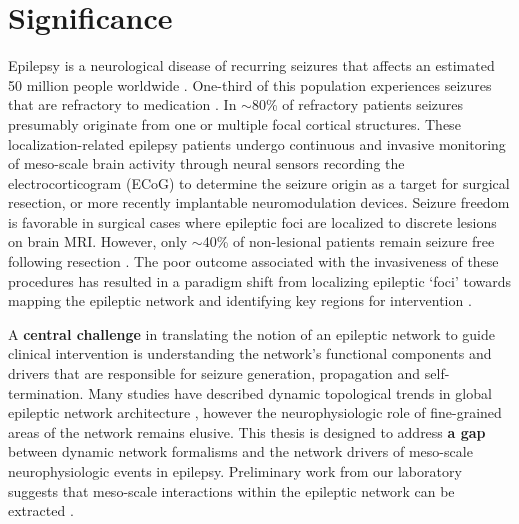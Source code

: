 \section{Significance}
Epilepsy is a neurological disease of recurring seizures that affects an estimated 50 million people worldwide \cite{kwan2000early}. One-third of this population experiences seizures that are refractory to medication \cite{kwan2000early}. In $\sim$80\% of refractory patients seizures presumably originate from one or multiple focal cortical structures. These localization-related epilepsy patients undergo continuous and invasive monitoring of meso-scale brain activity through neural sensors recording the electrocorticogram (ECoG) to determine the seizure origin as a target for surgical resection, or more recently implantable neuromodulation devices. Seizure freedom is favorable in surgical cases where epileptic foci are localized to discrete lesions on brain MRI. However, only $\sim$40\% of non-lesional patients remain seizure free following resection \cite{french2007refractory}. The poor outcome associated with the invasiveness of these procedures has resulted in a paradigm shift from localizing epileptic `foci' towards mapping the epileptic network and identifying key regions for intervention \cite{spencer2002neural, kramer2012epilepsy, lehnertz2014evolving}.

A \textbf{central challenge} in translating the notion of an epileptic network to guide clinical intervention is understanding the network's functional components and drivers that are responsible for seizure generation, propagation and self-termination. Many studies have described dynamic topological trends in global epileptic network architecture \cite{jerger2005multivariate, schindler2006assessing, schindler2008evolving, kramer2010coalescence, jiruska2012synchronization}, however the neurophysiologic role of fine-grained areas of the network remains elusive. This thesis is designed to address \textbf{a gap} between dynamic network formalisms and the network drivers of meso-scale neurophysiologic events in epilepsy. Preliminary work from our laboratory suggests that meso-scale interactions within the epileptic network can be extracted \cite{khambhati2014dynamic}.

